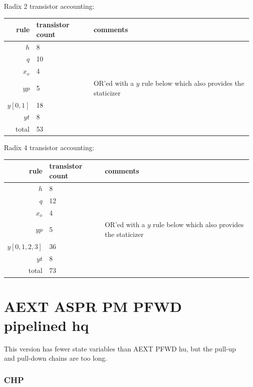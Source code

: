 \documentclass{article}
\begin{document}
\noindent
Radix 2 transistor accounting:

\begin{center}
    \begin{tabular}{|r|l|l|}
    \hline
    rule & transistor count & comments \\ \hline
    $h$ & 8 & \\ \hline
    $q$ & 10 & \\ \hline
    $x_o$ & 4 & \\ \hline
    $yp$ & 5 & OR'ed with a $y$ rule below which also provides the staticizer \\ \hline
    $y[0,1]$ & 18 & \\ \hline
    $yt$ & 8 & \\ \hline
    \hline total & 53 & \\ \hline
    \end{tabular}
\end{center}

\noindent
Radix 4 transistor accounting:

\begin{center}
    \begin{tabular}{|r|l|l|}
    \hline
    rule & transistor count & comments \\ \hline
    $h$ & 8 & \\ \hline
    $q$ & 12 & \\ \hline
    $x_o$ & 4 & \\ \hline
    $yp$ & 5 & OR'ed with a $y$ rule below which also provides the staticizer \\ \hline
    $y[0,1,2,3]$ & 36 & \\ \hline
    $yt$ & 8 & \\ \hline
    \hline total & 73 & \\ \hline
    \end{tabular}
\end{center}

\section{AEXT ASPR PM PFWD pipelined hq \label{sec:AEXT_ASPR_PM_PFWD_p_hq}}

This version has fewer state variables than AEXT PFWD hu, but the pull-up and pull-down chains are too long.

\subsubsection*{CHP}
\end{document}
